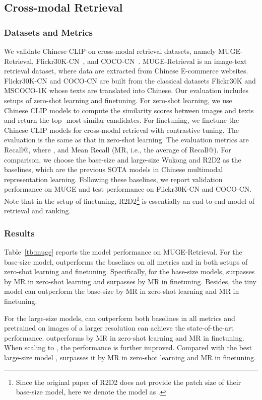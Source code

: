 \documentclass[11pt]{article}
\begin{document}
\subsection{Cross-modal Retrieval}


\subsubsection{Datasets and Metrics}
We validate Chinese CLIP on  cross-modal retrieval datasets, namely MUGE-Retrieval, Flickr30K-CN~\cite{flickr30k-cn}, and COCO-CN~\cite{coco-cn}. 
MUGE-Retrieval is an image-text retrieval dataset, where data are extracted from Chinese E-commerce websites. 
Flickr30K-CN and COCO-CN are built from the classical datasets Flickr30K and MSCOCO-1K whose texts are translated into Chinese. 
Our evaluation includes setups of zero-shot learning and finetuning. 
For zero-shot learning, we use Chinese CLIP models to compute the similarity scores between images and texts and return the top- most similar candidates. For finetuning, we finetune the Chinese CLIP models for cross-modal retrieval with contrastive tuning. The evaluation is the same as that in zero-shot learning. 
The evaluation metrics are Recall@, where , and Mean Recall (MR, i.e., the average of Recall@). 
For comparison, we choose the base-size and large-size Wukong and R2D2 as the baselines, which are the previous SOTA models in Chinese multimodal representation learning. 
Following these baselines, we report validation performance on MUGE and test performance on Flickr30K-CN and COCO-CN.
Note that in the setup of finetuning, R2D2\footnote{Since the original paper of R2D2 does not provide the patch size of their base-size model, here we denote the model as .} is essentially an end-to-end model of retrieval and ranking. 

\subsubsection{Results}
\label{subsubsec:results}
Table~\ref{tb:muge} reports the model performance on MUGE-Retrieval. For the base-size model,  outperforms the baselines on all metrics and in both setups of zero-shot learning and finetuning. 
Specifically, for the base-size models,  surpasses  by  MR in zero-shot learning and surpasses  by  MR in finetuning. 
Besides, the tiny model  can outperform the base-size  by  MR in zero-shot learning and  MR in finetuning. 

For the large-size models,  can outperform both baselines in all metrics and  pretrained on images of a larger resolution can achieve the state-of-the-art performance.  outperforms  by  MR in zero-shot learning and  MR in finetuning. 
When scaling to , the performance is further improved. Compared with the best large-size model ,  surpasses it by  MR in zero-shot learning and  MR in finetuning. 
\end{document}
